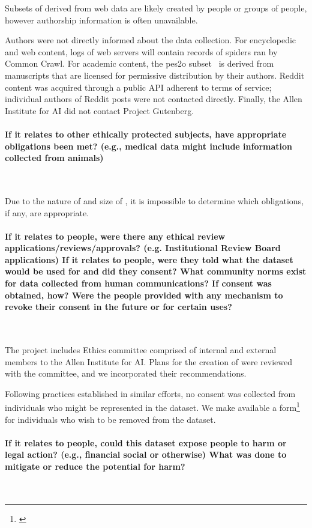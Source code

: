 Subsets of \dolma derived from web data are likely created by people or groups of people, however authorship information is often unavailable. 

Authors were not directly informed about the data collection. 
For encyclopedic and web content, logs of web servers will contain records of spiders ran by Common Crawl.
For academic content, the pes2o subset~\citep{peS2o} is derived from manuscripts that are licensed for permissive distribution by their authors.
Reddit content was acquired through a public API adherent to terms of service; individual authors of Reddit posts were not contacted directly.
Finally, the Allen Institute for AI did not contact Project Gutenberg.
 
\paragraph{If it relates to other ethically protected subjects, have appropriate obligations been met? (e.g., medical data might include information collected from animals)}~

Due to the nature of and size of \dolma, it is impossible to determine which obligations, if any, are appropriate. 


\paragraph{If it relates to people, were there any ethical review applications/reviews/approvals? (e.g. Institutional Review Board applications) If it relates to people, were they told what the dataset would be used for and did they consent? What community norms exist for data collected from human communications? If consent was obtained, how? Were the people provided with any mechanism to revoke their consent in the future or for certain uses?}~

The \dolma project includes Ethics committee comprised of 
internal and external members to the Allen Institute for AI.
Plans for the creation of \dolma were reviewed with the committee, and we incorporated their recommendations. 

Following practices established in similar efforts, no consent was collected from individuals who might be represented in the dataset.
We make available a form\footnote{\label{foot:data-removal}\href{https://forms.gle/q4BNUUxUxKwKkfdT6}{}} for individuals who wish to be removed from the dataset. 

\paragraph{If it relates to people, could this dataset expose people to harm or legal action? (e.g., financial social or otherwise) What was done to mitigate or reduce the potential for harm?}~

